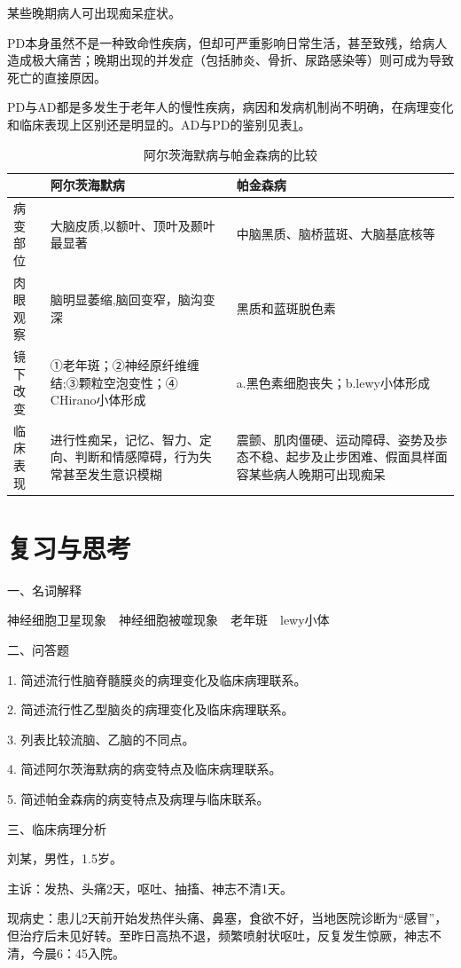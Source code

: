 某些晚期病人可出现痴呆症状。

PD本身虽然不是一种致命性疾病，但却可严重影响日常生活，甚至致残，给病人造成极大痛苦；晚期出现的并发症（包括肺炎、骨折、尿路感染等）则可成为导致死亡的直接原因。

PD与AD都是多发生于老年人的慢性疾病，病因和发病机制尚不明确，在病理变化和临床表现上区别还是明显的。AD与PD的鉴别见表\ref{tab13-2}。

\begin{table}[ht]
	\caption{阿尔茨海默病与帕金森病的比较}
	\label{tab13-2}
	\centering
	\begin{tabular}{lp{5cm}p{5cm}}
	\toprule
	&阿尔茨海默病&帕金森病\\
	\midrule
	病变部位&大脑皮质,以额叶、顶叶及颞叶最显著&中脑黑质、脑桥蓝斑、大脑基底核等\\
	肉眼观察&脑明显萎缩,脑回变窄，脑沟变深&黑质和蓝斑脱色素\\
	镜下改变&①老年斑；②神经原纤维缠结;③颗粒空泡变性；④ CHirano小体形成&a.黑色素细胞丧失；b.lewy小体形成\\
	临床表现&进行性痴呆，记忆、智力、定向、判断和情感障碍，行为失常甚至发生意识模糊&震颤、肌肉僵硬、运动障碍、姿势及歩态不稳、起步及止步困难、假面具样面容某些病人晚期可出现痴呆\\
	\bottomrule
	\end{tabular}
\end{table}

\section*{复习与思考}

{一、名词解释}

神经细胞卫星现象　神经细胞被噬现象　老年斑　lewy小体

{二、问答题}

1. 简述流行性脑脊髓膜炎的病理变化及临床病理联系。

2. 简述流行性乙型脑炎的病理变化及临床病理联系。

3. 列表比较流脑、乙脑的不同点。

4. 简述阿尔茨海默病的病变特点及临床病理联系。

5. 简述帕金森病的病变特点及病理与临床联系。

{三、临床病理分析}

刘某，男性，1.5岁。

主诉：发热、头痛2天，呕吐、抽搐、神志不清1天。

现病史：患儿2天前开始发热伴头痛、鼻塞，食欲不好，当地医院诊断为“感冒”，但治疗后未见好转。至昨日高热不退，频繁喷射状呕吐，反复发生惊厥，神志不清，今晨6：45入院。

